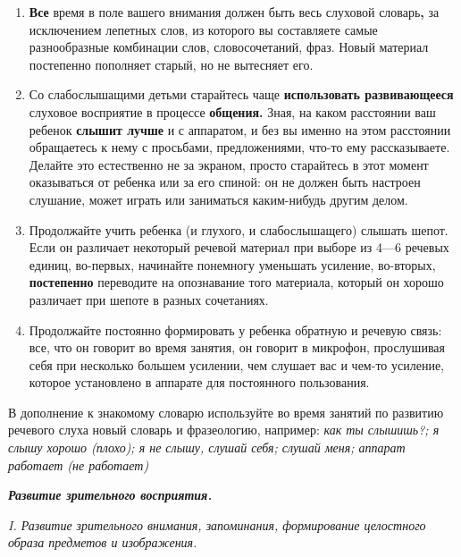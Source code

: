 \documentclass{book}
\renewcommand{\emph}[1]{\textit{#1}}
\begin{document}
\begin{enumerate}
\def\labelenumi{\arabic{enumi}.}
\setcounter{enumi}{2}
\item
  
  \textbf{Все} время в поле вашего внимания должен быть весь слуховой
  словарь\textbf{,} за исключением лепетных слов, из которого вы
  составляете самые разнообразные комбинации слов, словосочетаний, фраз.
  Новый материал постепенно пополняет старый, но не вытесняет его.
  
\item
  
  Со слабослышащими детьми старайтесь чаще \textbf{использовать
  развивающееся} слуховое восприятие в процессе \textbf{общения.} Зная,
  на каком расстоянии ваш ребенок \textbf{слышит лучше} и с аппаратом, и
  без вы именно на этом расстоянии обращаетесь к нему с просьбами,
  предложениями, что-то ему рассказываете. Делайте это естественно не за
  экраном, просто старайтесь в этот момент оказываться от ребенка или за
  его спиной: он не должен быть настроен слушание, может играть или
  заниматься каким-нибудь другим делом.
  
\item
  
  Продолжайте учить ребенка (и глухого, и слабослышащего) слышать шепот.
  Если он различает некоторый речевой материал при выборе из 4---6
  речевых единиц, во-первых, начинайте понемногу уменьшать усиление,
  во-вторых, \textbf{постепенно} переводите на опознавание того
  материала, который он хорошо различает при шепоте в разных сочетаниях.
  
\item
  
  Продолжайте постоянно формировать у ребенка обратную и речевую связь:
  все, что он говорит во время занятия, он говорит в микрофон,
  прослушивая себя при несколько большем усилении, чем слушает вас и
  чем-то усиление, которое установлено в аппарате для постоянного
  пользования.
  
\end{enumerate}


В дополнение к знакомому словарю используйте во время занятий по
развитию речевого слуха новый словарь и фразеологию, например: \emph{как
ты слышишь?; я слышу хорошо (плохо); я не слышу, слушай себя; слушай
меня; аппарат работает (не работает)}

\emph{\textbf{Развитие зрительного восприятия.}}

\emph{I. Развитие зрительного внимания, запоминания, формирование
целостного образа предметов и изображения.}
\end{document}
